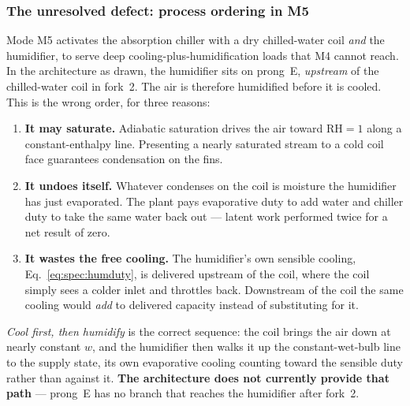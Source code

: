 \documentclass[11pt]{article}
\newcommand{\RH}{\ensuremath{\mathrm{RH}}}
\begin{document}
\subsubsection{The unresolved defect: process ordering in M5}
Mode M5 activates the absorption chiller with a dry chilled-water coil \emph{and} the humidifier, to
serve deep cooling-plus-humidification loads that M4 cannot reach. In the architecture as drawn, the
humidifier sits on prong~E, \emph{upstream} of the chilled-water coil in fork~2. The air is therefore
humidified before it is cooled. This is the wrong order, for three reasons:
\begin{enumerate}[nosep]
\item \textbf{It may saturate.} Adiabatic saturation drives the air toward $\RH=1$ along a
constant-enthalpy line. Presenting a nearly saturated stream to a cold coil face guarantees
condensation on the fins.
\item \textbf{It undoes itself.} Whatever condenses on the coil is moisture the humidifier has just
evaporated. The plant pays evaporative duty to add water and chiller duty to take the same water back
out --- latent work performed twice for a net result of zero.
\item \textbf{It wastes the free cooling.} The humidifier's own sensible cooling,
Eq.~\eqref{eq:spec:humduty}, is delivered upstream of the coil, where the coil simply sees a colder
inlet and throttles back. Downstream of the coil the same cooling would \emph{add} to delivered
capacity instead of substituting for it.
\end{enumerate}

\emph{Cool first, then humidify} is the correct sequence: the coil brings the air down at nearly
constant $w$, and the humidifier then walks it up the constant-wet-bulb line to the supply state,
its own evaporative cooling counting toward the sensible duty rather than against it.
\textbf{The architecture does not currently provide that path} --- prong~E has no branch that
reaches the humidifier after fork~2.
\end{document}
